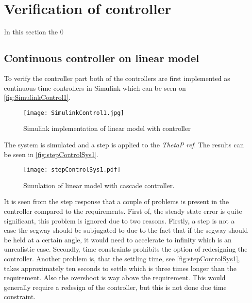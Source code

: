 \section{Verification of controller}
In this section the 0 

\subsection{Continuous controller on linear model}
To verify the controller part both of the controllers are first implemented as continuous time controllers in Simulink which can be seen on \autoref{fig:SimulinkControl1}.

\begin{figure}[H]
\centering
\texttt{[image: SimulinkControl1.jpg]}
\caption{Simulink implementation of linear model with controller}
\label{fig:SimulinkControl1}
\end{figure}

The system is simulated and a step is applied to the \textit{ThetaP ref}. The results can be seen in \autoref{fig:stepControlSys1}.
\begin{figure}[H]
\centering
\texttt{[image: stepControlSys1.pdf]}
\caption{Simulation of linear model with cascade controller.}
\label{fig:stepControlSys1}
\end{figure}

It is seen from the step response that a couple of problems is present in the controller compared to the requirements. First of, the steady state error is quite significant, this problem is ignored due to two reasons. Firstly, a step is not a case the segway should be subjugated to due to the fact that if the segway should be held at a certain angle, it would need to accelerate to infinity which is an unrealistic case. Secondly, time constraints prohibits the option of redesigning the controller. Another problem is, that the settling time, see \autoref{fig:stepControlSys1}, takes approximately ten seconds to settle which is three times longer than the requirement. Also the overshoot is way above the requirement. This would generally require a redesign of the controller, but this is not done due time constraint.
